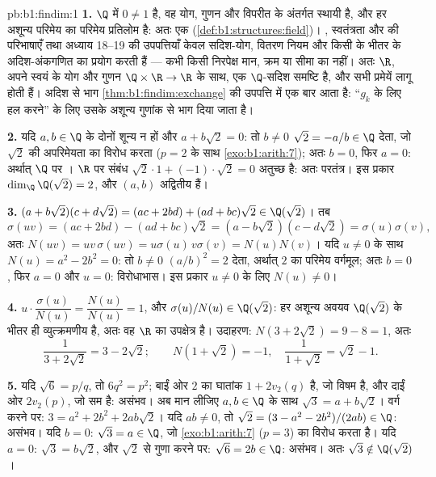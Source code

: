 \begin{solution}{pb:b1:findim:1}
\textbf{1.} $\Q$ में $0 \neq 1$ है, वह योग, गुणन और विपरीत के अंतर्गत स्थायी
है, और हर अशून्य परिमेय का परिमेय प्रतिलोम है: अतः एक 
(\cref{def:b1:structures:field})। , स्वतंत्रता और  की
परिभाषाएँ तथा अध्याय 18--19 की उपपत्तियाँ केवल सदिश-योग, वितरण नियम और किसी
 के भीतर के अदिश-अंकगणित का प्रयोग करती हैं --- कभी किसी निरपेक्ष
मान, क्रम या सीमा का नहीं। अतः $\R$, अपने स्वयं के योग और गुणन $\Q \times \R
\to \R$ के साथ, एक $\Q$-सदिश समष्टि है, और सभी प्रमेयें लागू होती हैं। अदिश
से भाग \cref{thm:b1:findim:exchange} की उपपत्ति में एक बार आता है: ``$g_k$
के लिए हल करने'' के लिए उसके अशून्य गुणांक से भाग दिया जाता है।

\textbf{2.} यदि $a, b \in \Q$ के दोनों शून्य न हों और $a + b\sqrt2 = 0$: तो
$b \neq 0$ $\sqrt2 = -a/b \in \Q$ देता, जो $\sqrt2$ की अपरिमेयता का विरोध
करता ($p = 2$ के साथ \cref{exo:b1:arith:7}); अतः $b = 0$, फिर $a = 0$:
अर्थात् $\Q$ पर । $\R$ पर संबंध $\sqrt2\cdot 1 + (-1)\cdot\sqrt2 =
0$ अतुच्छ है: अतः परतंत्र। इस प्रकार $\dim_\Q \Q(\sqrt2) = 2$, और 
$(a, b)$ अद्वितीय हैं।

\textbf{3.} $(a + b\sqrt2)(c + d\sqrt2) = (ac + 2bd) + (ad + bc)\sqrt2 \in
\Q(\sqrt2)$। तब
\[
\sigma(uv) = (ac + 2bd) - (ad + bc)\sqrt2
= (a - b\sqrt2)(c - d\sqrt2) = \sigma(u)\sigma(v),
\]
अतः $N(uv) = uv\,\sigma(uv) = u\sigma(u)\,v\sigma(v) = N(u)N(v)$। यदि $u
\neq 0$ के साथ $N(u) = a^2 - 2b^2 = 0$: तो $b \neq 0$ $(a/b)^2 = 2$ देता,
अर्थात् $2$ का परिमेय वर्गमूल; अतः $b = 0$, फिर $a = 0$ और $u = 0$:
विरोधाभास। इस प्रकार $u \neq 0$ के लिए $N(u) \neq 0$।

\textbf{4.} $u \cdot \dfrac{\sigma(u)}{N(u)} = \dfrac{N(u)}{N(u)} = 1$, और
$\sigma(u)/N(u) \in \Q(\sqrt2)$: हर अशून्य अवयव $\Q(\sqrt2)$ के भीतर ही
व्युत्क्रमणीय है, अतः वह $\R$ का उपक्षेत्र है। उदाहरण: $N(3 + 2\sqrt2) = 9 -
8 = 1$, अतः
\[
\frac1{3 + 2\sqrt2} = 3 - 2\sqrt2 ;
\qquad
N(1 + \sqrt2) = -1, \quad
\frac1{1 + \sqrt2} = \sqrt2 - 1 .
\]

\textbf{5.} यदि $\sqrt6 = p/q$, तो $6q^2 = p^2$; बाईं ओर $2$ का घातांक $1 +
2v_2(q)$ है, जो विषम है, और दाईं ओर $2v_2(p)$, जो सम है: असंभव। अब मान लीजिए
$a, b \in \Q$ के साथ $\sqrt3 = a + b\sqrt2$। वर्ग करने पर: $3 = a^2 + 2b^2 +
2ab\sqrt2$। यदि $ab \neq 0$, तो $\sqrt2 = (3 - a^2 - 2b^2)/(2ab) \in \Q$:
असंभव। यदि $b = 0$: $\sqrt3 = a \in \Q$, जो \cref{exo:b1:arith:7} ($p = 3$)
का विरोध करता है। यदि $a = 0$: $\sqrt3 = b\sqrt2$, और $\sqrt2$ से गुणा करने
पर: $\sqrt6 = 2b \in \Q$: असंभव। अतः $\sqrt3 \notin \Q(\sqrt2)$।


\end{solution}
